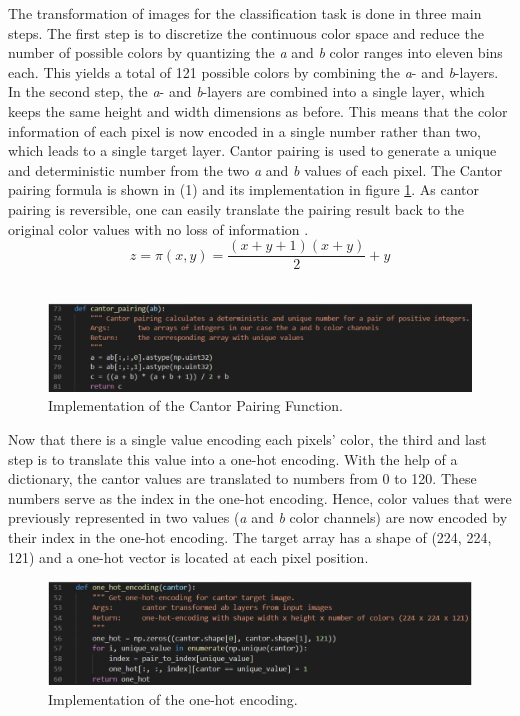 \documentclass[12pt,letterpaper]{article}
\begin{document}
The transformation of images for the classification task is done in three main steps. The first step is to discretize the continuous color space and reduce the number of possible colors by quantizing the \emph{a} and \emph{b} color ranges into eleven bins each. This yields a total of 121 possible colors by combining the \emph{a}- and \emph{b}-layers. In the second step, the \emph{a}- and \emph{b}-layers are combined into a single layer, which keeps the same height and width dimensions as before. This means that the color information of each pixel is now encoded in a single number rather than two, which leads to a single target layer. Cantor pairing is used to generate a unique and deterministic number from the two \emph{a} and \emph{b} values of each pixel. The Cantor pairing formula is shown in (1) and its implementation in figure \ref{cantorpairing}. As cantor pairing is reversible, one can easily translate the pairing result back to the original color values with no loss of information \citep{cantor2007}.\\
\begin{equation}
z = \pi(x,y) = \frac{(x+y+1)(x+y)}{2}+y
\end{equation}\\
\begin{figure}[h]
	\centering
	\includegraphics[width=1.0\textwidth]{code_cantor_pairing.png}
	\caption{Implementation of the Cantor Pairing Function.}
	\label{cantorpairing}
\end{figure}
Now that there is a single value encoding each pixels’ color, the third and last step is to translate this value into a one-hot encoding. With the help of a dictionary, the cantor values are translated to numbers from 0 to 120. These numbers serve as the index in the one-hot encoding. Hence, color values that were previously represented in two values (\emph{a} and \emph{b} color channels) are now encoded by their index in the one-hot encoding. The target array has a shape of (224, 224, 121) and a one-hot vector is located at each pixel position.
\begin{figure}[htb]
	\centering
	\includegraphics[width=1.0\textwidth]{code_onehot.png}
	\caption{Implementation of the one-hot encoding.}
	\label{onehot}
\end{figure}
\end{document}
